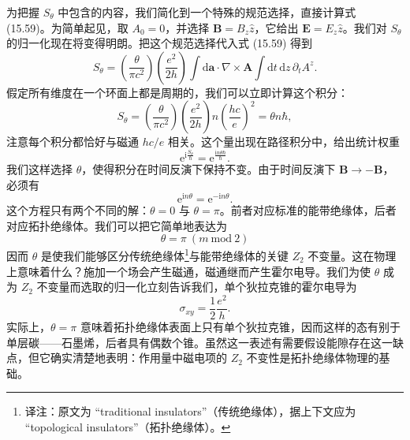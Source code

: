 为把握 $S_{\theta}$ 中包含的内容，我们简化到一个特殊的规范选择，直接计算式 (15.59)。为简单起见，取 $A_{0}=0$，并选择 $\mathbf{B}=B_{z}\widehat{z}$，它给出 $\mathbf{E}=E_{z}\widehat{z}$。我们对 $S_{\theta}$ 的归一化现在将变得明朗。把这个规范选择代入式 (15.59) 得到
\begin{equation*}
S_{\theta}=\left(\frac{\theta}{\pi c^{2}}\right)\left(\frac{e^{2}}{2h}\right)\int\mathrm{d}\mathbf{a}\cdot\nabla\times\mathbf{A}\int\mathrm{d}t\,\mathrm{d}z\,\partial_{t}A^{z}.\tag{15.77}
\end{equation*}
假定所有维度在一个环面上都是周期的，我们可以立即计算这个积分：
\begin{equation*}
S_{\theta}=\left(\frac{\theta}{\pi c^{2}}\right)\left(\frac{e^{2}}{2h}\right)n\left(\frac{hc}{e}\right)^{2}=\theta n\hbar,\tag{15.78}
\end{equation*}
注意每个积分都恰好与磁通 $hc/e$ 相关。这个量出现在路径积分中，给出统计权重
\begin{equation*}
\mathrm{e}^{\mathrm{i}\frac{S_{\theta}}{\hbar}}=\mathrm{e}^{\frac{\mathrm{i}n\theta\hbar}{\hbar}}.\tag{15.79}
\end{equation*}
我们这样选择 $\theta$，使得积分在时间反演下保持不变。由于时间反演下 $\mathbf{B}\rightarrow-\mathbf{B}$，必须有
\begin{equation*}
\mathrm{e}^{\mathrm{i}n\theta}=\mathrm{e}^{-\mathrm{i}n\theta}.\tag{15.80}
\end{equation*}
这个方程只有两个不同的解：$\theta=0$ 与 $\theta=\pi$。前者对应标准的能带绝缘体，后者对应拓扑绝缘体。我们可以把它简单地表达为
\begin{equation*}
\theta=\pi\ (m\ \mathrm{mod}\ 2)\tag{15.81}
\end{equation*}
因而 $\theta$ 是使我们能够区分传统绝缘体\footnote{译注：原文为 ``traditional insulators''（传统绝缘体），据上下文应为 ``topological insulators''（拓扑绝缘体）。}与能带绝缘体的关键 $Z_{2}$ 不变量。这在物理上意味着什么？施加一个场会产生磁通，磁通继而产生霍尔电导。我们为使 $\theta$ 成为 $Z_{2}$ 不变量而选取的归一化立刻告诉我们，单个狄拉克锥的霍尔电导为
\begin{equation*}
\sigma_{xy}=\frac{1}{2}\frac{e^{2}}{h}.\tag{15.82}
\end{equation*}
实际上，$\theta=\pi$ 意味着拓扑绝缘体表面上只有单个狄拉克锥，因而这样的态有别于单层碳——石墨烯，后者具有偶数个锥。虽然这一表述有需要假设能隙存在这一缺点，但它确实清楚地表明：作用量中磁电项的 $Z_{2}$ 不变性是拓扑绝缘体物理的基础。
